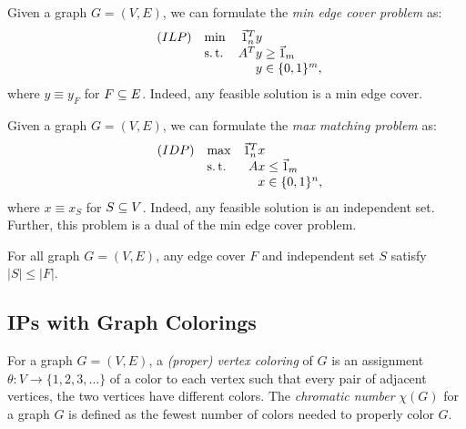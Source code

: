 \begin{defn}
    \label{def:min-edge-cover-formulation}
    Given a graph $G=(V,E)$, we can formulate the \textit{min edge cover problem} as:
        \begin{equation*}
        \begin{array}{llr@{}l@{}}
            (ILP)   & \min  &   \one_n^T y  &               \\
                    & \st   &       A^T y   &{}\ge \one_m   \\
                    &       &       y       &{}\in \{0,1\}^m,
        \end{array}
        \end{equation*}
    where $y \equiv y_F$ for $F \subseteq E$. Indeed, any feasible solution is a min edge cover.
\end{defn}

\begin{defn}
    \label{def:max-ind-set-formulation}
    Given a graph $G=(V,E)$, we can formulate the \textit{max matching problem} as:
        \begin{equation*}
        \begin{array}{llr@{}l@{}}
            (IDP)   & \max  &   \one_n^T x  &               \\
                    & \st   &       Ax      &{}\le \one_m   \\
                    &       &       x       &{}\in \{0,1\}^n,
        \end{array}
        \end{equation*}
    where $x \equiv x_S$ for $S \subseteq V$. Indeed, any feasible solution is an independent set. Further, this problem is a dual of the min edge cover problem.
\end{defn}

\begin{thm}
    \label{thm:weak-duality-min-edge-cover-max-ind-set}
    For all graph $G = (V,E)$, any edge cover $F$ and independent set $S$ satisfy $|S| \le |F|$.
\end{thm}


\subsection{IPs with Graph Colorings}
\label{subsec:ips-with-graph-colorings}

\begin{defn}
    \label{def:vertex-coloring}
    For a graph $G = (V,E)$, a \textit{(proper) vertex coloring} of $G$ is an assignment $\theta: V \rightarrow \{1, 2, 3, \dots\}$ of a color to each vertex such that every pair of adjacent vertices, the two vertices have different colors. The \textit{chromatic number} $\chi(G)$ for a graph $G$ is defined as the fewest number of colors needed to properly color $G$.
\end{defn}

